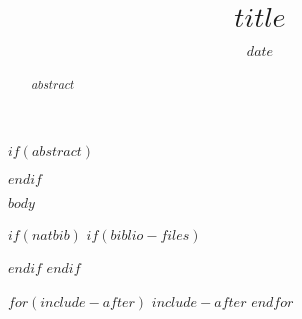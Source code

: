 \documentclass{tufte-handout}
\title{$title$}
\author$if(author.email)$[$author.email$]$endif$$if(author.name)${$author.name$}$endif$
\date{$date$} %
\begin{document}
\maketitle%

% 
$if(abstract)$
\begin{abstract}
\noindent
$abstract$
\end{abstract}
$endif$


$body$

$if(natbib)$
$if(biblio-files)$


$endif$
$endif$

$for(include-after)$
$include-after$
$endfor$
\end{document}
